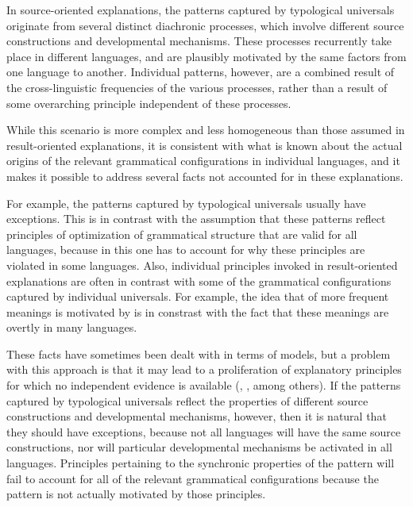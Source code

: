 \documentclass[output=paper]{langsci/langscibook}
\begin{document}
In 
\label{p:cristofaro:strands}
source-oriented explanations,  the patterns
captured by typological universals originate from several distinct diachronic processes, which involve
different source constructions and developmental mechanisms. 
These
processes recurrently take place in different languages, and are
plausibly motivated by the same factors from one language to another. Individual patterns, however, are a combined
result of the cross-linguistic frequencies of the various processes, rather than a result
of some 
overarching principle independent of these processes.

While
this scenario is 
more complex and less homogeneous than those assumed in result-oriented explanations, it is consistent with what is known about the actual origins of
the relevant grammatical configurations in individual languages, and it
makes it possible to address several facts  not accounted for in
these explanations. 

For example, the patterns captured by typological universals usually
have exceptions. This is
in contrast with the assumption that these patterns reflect principles of optimization of
grammatical structure that are valid for all languages, because in
this  one has to account for why these principles are violated in
some languages. Also, individual principles invoked in result-oriented
explanations are often in contrast with some of the
grammatical configurations captured by individual universals. For
example, the idea that  of more frequent meanings is
motivated by  is in constrast with the fact that these meanings
are overtly  in many languages. 

These facts have sometimes been
dealt with in terms of  models, but a 
problem with this approach is that it may lead to a
proliferation of explanatory principles for which no independent
evidence is available (, \citealt{Otacompetingmotivations}, among
others). If the patterns captured by typological universals reflect the properties of different
source constructions and developmental mechanisms, however,  then 
\label{p:cristofaro:commonalitiesexceptions}
it is
natural that they should have exceptions, because not all
languages will have the same source constructions, nor will
particular developmental mechanisms be activated in all
languages. Principles pertaining to the synchronic properties of the
pattern will fail to account for all of the relevant grammatical
configurations because the pattern is not actually motivated by those principles.
\end{document}
